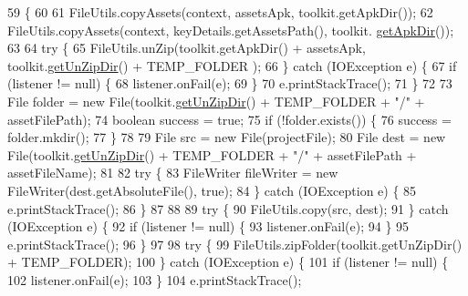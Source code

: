 \begin{DoxyCode}
59                       \{
60 
61         FileUtils.copyAssets(context, assetsApk, toolkit.getApkDir());
62         FileUtils.copyAssets(context, keyDetails.getAssetsPath(), toolkit.
      \hyperlink{classorg_1_1buildmlearn_1_1toolkit_1_1ToolkitApplication_a976b0d6036419bd9382ffdca98b79fb4}{getApkDir}());
63 
64         \textcolor{keywordflow}{try} \{
65             FileUtils.unZip(toolkit.getApkDir() + assetsApk, toolkit.\hyperlink{classorg_1_1buildmlearn_1_1toolkit_1_1ToolkitApplication_a4f504e66f421dfc2f9dfd6810c2a86cb}{getUnZipDir}() + TEMP\_FOLDER
      );
66         \} \textcolor{keywordflow}{catch} (IOException e) \{
67             \textcolor{keywordflow}{if} (listener != null) \{
68                 listener.onFail(e);
69             \}
70             e.printStackTrace();
71         \}
72 
73         File folder = \textcolor{keyword}{new} File(toolkit.\hyperlink{classorg_1_1buildmlearn_1_1toolkit_1_1ToolkitApplication_a4f504e66f421dfc2f9dfd6810c2a86cb}{getUnZipDir}() + TEMP\_FOLDER + \textcolor{stringliteral}{"/"} + assetFilePath);
74         \textcolor{keywordtype}{boolean} success = \textcolor{keyword}{true};
75         \textcolor{keywordflow}{if} (!folder.exists()) \{
76             success = folder.mkdir();
77         \}
78 
79         File src = \textcolor{keyword}{new} File(projectFile);
80         File dest = \textcolor{keyword}{new} File(toolkit.\hyperlink{classorg_1_1buildmlearn_1_1toolkit_1_1ToolkitApplication_a4f504e66f421dfc2f9dfd6810c2a86cb}{getUnZipDir}() + TEMP\_FOLDER + \textcolor{stringliteral}{"/"} + assetFilePath + 
      assetFileName);
81 
82         \textcolor{keywordflow}{try} \{
83             FileWriter fileWriter = \textcolor{keyword}{new} FileWriter(dest.getAbsoluteFile(), \textcolor{keyword}{true});
84         \} \textcolor{keywordflow}{catch} (IOException e) \{
85             e.printStackTrace();
86         \}
87 
88 
89         \textcolor{keywordflow}{try} \{
90             FileUtils.copy(src, dest);
91         \} \textcolor{keywordflow}{catch} (IOException e) \{
92             \textcolor{keywordflow}{if} (listener != null) \{
93                 listener.onFail(e);
94             \}
95             e.printStackTrace();
96         \}
97 
98         \textcolor{keywordflow}{try} \{
99             FileUtils.zipFolder(toolkit.getUnZipDir() + TEMP\_FOLDER);
100         \} \textcolor{keywordflow}{catch} (IOException e) \{
101             \textcolor{keywordflow}{if} (listener != null) \{
102                 listener.onFail(e);
103             \}
104             e.printStackTrace();

\end{DoxyCode}
